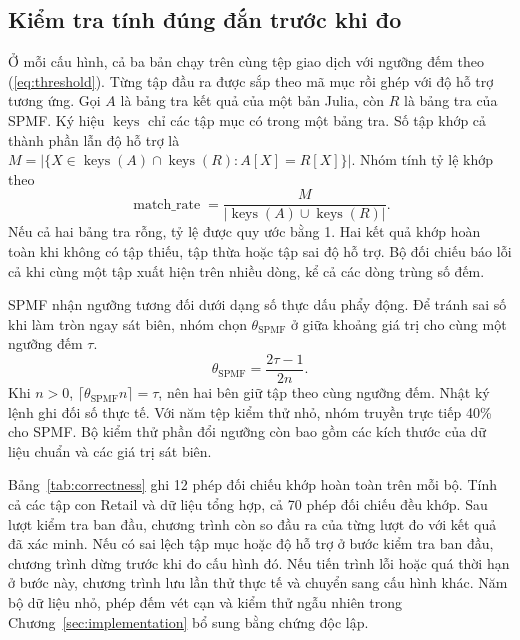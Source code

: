 \subsection{Kiểm tra tính đúng đắn trước khi đo}
Ở mỗi cấu hình, cả ba bản chạy trên cùng tệp giao dịch với ngưỡng
đếm theo (\ref{eq:threshold}). Từng tập đầu ra được sắp theo mã mục
rồi ghép với độ hỗ trợ tương ứng. Gọi $A$ là bảng tra kết quả của một
bản Julia, còn $R$ là bảng tra của SPMF. Ký hiệu $\operatorname{keys}$
chỉ các tập mục có trong một bảng tra. Số tập khớp cả thành phần
lẫn độ hỗ trợ là
$M=|\{X\in\operatorname{keys}(A)\cap\operatorname{keys}(R):
A[X]=R[X]\}|$. Nhóm tính tỷ lệ khớp theo
\begin{equation}
 \operatorname{match\_rate}=\frac{M}{|\operatorname{keys}(A)\cup\operatorname{keys}(R)|}.
 \label{eq:match}
\end{equation}
Nếu cả hai bảng tra rỗng, tỷ lệ được quy ước bằng 1. Hai kết quả
khớp hoàn toàn khi không có tập thiếu, tập thừa hoặc tập sai độ hỗ
trợ. Bộ đối chiếu báo lỗi cả khi cùng một tập xuất hiện trên nhiều
dòng, kể cả các dòng trùng số đếm.

SPMF nhận ngưỡng tương đối dưới dạng số thực dấu phẩy động. Để
tránh sai số khi làm tròn ngay sát biên, nhóm chọn
$\theta_{\mathrm{SPMF}}$ ở giữa khoảng giá trị cho cùng một
ngưỡng đếm $\tau$.
\begin{equation}
 \theta_{\mathrm{SPMF}}=\frac{2\tau-1}{2n}.
 \label{eq:spmf-bin}
\end{equation}
Khi $n>0$, $\lceil\theta_{\mathrm{SPMF}}n\rceil=\tau$, nên hai bên
giữ tập theo cùng ngưỡng đếm. Nhật ký lệnh ghi đối số thực tế.
Với năm tệp kiểm thử nhỏ, nhóm truyền trực tiếp 40\% cho SPMF.
Bộ kiểm thử phần đổi ngưỡng còn bao gồm các kích thước của dữ
liệu chuẩn và các giá trị sát biên.

\begin{table}[tb]
\centering
\caption{Số phép so với SPMF trên bốn bộ dữ liệu chuẩn. Mỗi ngưỡng có một phép so cho từng bản Julia, xét cả tập phổ biến và độ hỗ trợ. Nguồn số liệu là \texttt{results/correctness/comparisons.csv}.}
\label{tab:correctness}
\TableCorrectness
\end{table}

Bảng~\ref{tab:correctness} ghi 12 phép đối chiếu khớp hoàn toàn trên
mỗi bộ. Tính cả các tập con Retail và dữ liệu tổng hợp, cả 70 phép
đối chiếu đều khớp. Sau lượt kiểm tra ban đầu, chương trình còn so
đầu ra của từng lượt đo với kết quả đã xác minh. Nếu có sai lệch
tập mục hoặc độ hỗ trợ ở bước kiểm tra ban đầu, chương trình dừng
trước khi đo cấu hình đó. Nếu tiến trình lỗi hoặc quá thời hạn ở
bước này, chương trình lưu lần thử thực tế và chuyển sang cấu hình
khác. Năm bộ dữ liệu nhỏ, phép đếm vét cạn và kiểm thử ngẫu nhiên
trong Chương~\ref{sec:implementation} bổ sung bằng chứng độc lập.

